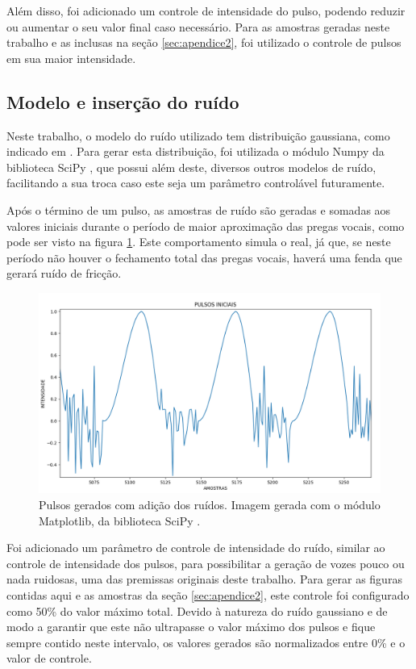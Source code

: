 \documentclass[
  12pt,       
  openright,      
  twoside,      
  a4paper,      
  english,      
  french,       
  spanish,      
  brazil,     
  ]{abntex2}
\begin{document}
Além disso, foi adicionado um controle de intensidade do pulso, podendo reduzir ou aumentar o seu valor final caso necessário. Para as amostras geradas neste trabalho e as inclusas na seção \ref{sec:apendice2}, foi utilizado o controle de pulsos em sua maior intensidade.

\subsection{Modelo e inserção do ruído}
Neste trabalho, o modelo do ruído utilizado tem distribuição gaussiana, como indicado em . Para gerar esta distribuição, foi utilizada o módulo Numpy da biblioteca SciPy \cite{scipy}, que possui além deste, diversos outros modelos de ruído, facilitando a sua troca caso este seja um parâmetro controlável futuramente.

Após o término de um pulso, as amostras de ruído são geradas e somadas aos valores iniciais durante o período de maior aproximação das pregas vocais, como pode ser visto na figura \ref{fig:pulsosComRuidos}. Este comportamento simula o real, já que, se neste período não houver o fechamento total das pregas vocais, haverá uma fenda que gerará ruído de fricção.

\begin{figure}
\includegraphics[width=\textwidth,keepaspectratio]{imagens/pulsos_iniciais_ft_ruido.PNG}
\caption{Pulsos gerados com adição dos ruídos. Imagem gerada com o módulo Matplotlib, da biblioteca SciPy \cite{scipy}.}
\label{fig:pulsosComRuidos}
\end{figure}

Foi adicionado um parâmetro de controle de intensidade do ruído, similar ao controle de intensidade dos pulsos, para possibilitar a geração de vozes pouco ou nada ruidosas, uma das premissas originais deste trabalho. Para gerar as figuras contidas aqui e as amostras da seção \ref{sec:apendice2}, este controle foi configurado como 50\% do valor máximo total. Devido à natureza do ruído gaussiano e de modo a garantir que este não ultrapasse o valor máximo dos pulsos e fique sempre contido neste intervalo, os valores gerados são normalizados entre 0\% e o valor de controle.
\end{document}
